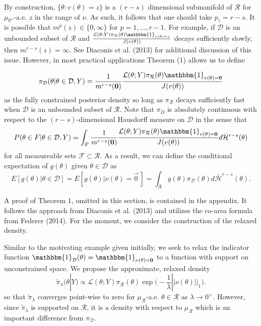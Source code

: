\documentclass[12 point]{article}
\begin{document}
By construction, $\{\theta:v(\theta)=z\}$ is a $(r-s)$ dimensional submanifold of $\mathcal{R}$ for $\mu_{\mathbb{R}^s}$-a.e. $z$ in the range of $\nu$. As such, it follows that one should take $p_z=r-s$.  %
It is possible that $m^p(z)\in\{0,\infty\}$ for $p=1,\dots,r-1$.  For example, if $\mathcal{D}$ is an unbounded subset of $\mathcal{R}$ and $\frac{\mathcal{L}(\theta; Y) \pi_\mathcal{R}(\theta) \mathbbm{1}_{v(\theta)=z}}{J(v(\theta))}$ decays sufficiently slowly, then $m^{r-s}(z)=\infty.$  See Diaconis et al. (2013) for additional discussion of this issue.  However, in most practical applications  Theorem (1) allows us to define 

\begin{equation}
\label{EQ:Constrained_rcp}
\pi_\mathcal{D}(\theta|\theta\in\mathcal{D},Y) = \frac{1}{m^{r-s}(\bf{0})} \frac{\mathcal{L}(\theta; Y) \pi_\mathcal{R}(\theta) \mathbbm{1}_{v(\theta)=\bf{0}}}{J(v(\theta))}
\end{equation} 
as the fully constrained posterior density so long as $\pi_\mathcal{R}$ decays sufficiently fast when $\mathcal{D}$ is an unbounded subset of $\mathcal{R}.$  Note that $\pi_D$ is absolutely continuous with respect to the $(r-s)$-dimensional Hausdorff measure on $\mathcal{D}$ in the sense that $$P(\theta \in F|\theta\in\mathcal{D},Y) =  \int_F \frac{1}{m^{r-s}(\bf{0})} \frac{\mathcal{L}(\theta; Y) \pi_\mathcal{R}(\theta) \mathbbm{1}_{v(\theta)=\bf{0}}}{J(v(\theta))}d\bar{\mathcal{H}}^{r-s}(\theta)$$ for all measureable sets $\mathcal{F}\subset \mathcal{R}$. As a result, we can define the conditional  expectation of $g(\theta)$ given $\theta \in \mathcal{D}$ as 
$$E[g(\theta) | \theta\in\mathcal{D}] = E[g(\theta) | \nu(\theta) =\vec{0}\,] = \int_\mathcal{R} g(\theta) \pi_\mathcal{D}(\theta) d\bar{\mathcal{H}}^{r-s}(\theta).$$

A proof of Theorem 1, omitted in this section, is contained in the appendix. It follows the approach from Diaconis et al. (2013) and utilizes the co-area formula from Federer (2014). For the moment, we consider the construction of the relaxed density.

Similar to the motivating example given initially, we seek to relax the indicator function $\mathbbm{1}_\mathcal{D}(\theta) = \mathbbm{1}_{\nu(\theta)=\bf{0}}$ to a function with support on unconstrained space.  We propose the approximate, relaxed density
\begin{equation}
\label{EQ:Relaxed_rcp}
\tilde{\pi}_\lambda(\theta|Y) \propto \mathcal{L}(\theta; Y) \pi_\mathcal{R}(\theta) \exp\bigg(-\frac{1}{\lambda}||\nu(\theta)||_1\bigg) .
\end{equation}
so that $\tilde{\pi}_\lambda$ converges point-wise to zero for $\mu_\mathcal{R}$-a.e. $\theta\in\mathcal{R}$ as $\lambda\to 0^+.$  However, since $\tilde{\pi}_\lambda$ is supported on $\mathcal{R}$, it is a density with respect to $\mu_\mathcal{R}$ which is an important difference from $\pi_\mathcal{D}$. 
\end{document}
